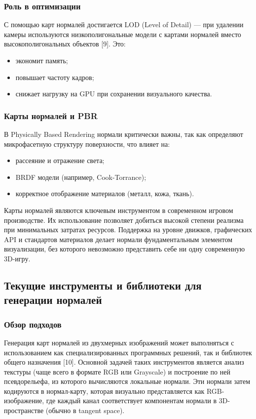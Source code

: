 \subsubsection{Роль в оптимизации}

С помощью карт нормалей достигается LOD (Level of Detail) — при удалении камеры используются низкополигональные модели с картами нормалей вместо высокополигональных объектов [9]. Это:
\begin{itemize}
	\item экономит память;
	\item повышает частоту кадров;
	\item снижает нагрузку на GPU при сохранении визуального качества.
\end{itemize}
\subsubsection{Карты нормалей и PBR}

В Physically Based Rendering нормали критически важны, так как определяют микрофасетную структуру поверхности, что влияет на:
\begin{itemize}
	\item рассеяние и отражение света;
	\item BRDF модели (например, Cook-Torrance);
	\item корректное отображение материалов (металл, кожа, ткань).
\end{itemize}

Карты нормалей являются ключевым инструментом в современном игровом производстве. Их использование позволяет добиться высокой степени реализма при минимальных затратах ресурсов. Поддержка на уровне движков, графических API и стандартов материалов делает нормали фундаментальным элементом визуализации, без которого невозможно представить себе ни одну современную 3D-игру.
\subsection{Текущие инструменты и библиотеки для генерации нормалей}
\subsubsection{Обзор подходов}

Генерация карт нормалей из двухмерных изображений может выполняться с использованием как специализированных программных решений, так и библиотек общего назначения [10]. Основной задачей таких инструментов является анализ текстуры (чаще всего в формате RGB или Grayscale) и построение по ней псевдорельефа, из которого вычисляются локальные нормали. Эти нормали затем кодируются в нормал-карту, которая визуально представляется как RGB-изображение, где каждый канал соответствует компонентам нормали в 3D-пространстве (обычно в tangent space).

